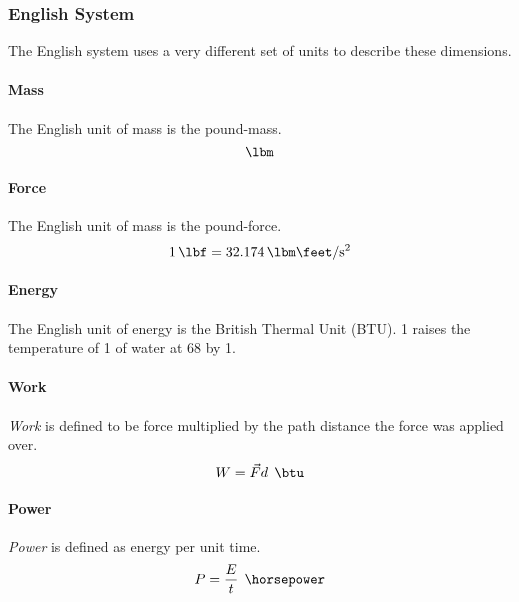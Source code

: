 \subsubsection{English System}\label{subsubsec:English_System}
The English system uses a very different set of units to describe these dimensions.

\paragraph{Mass}\label{par:English_Mass}
The English unit of mass is the pound-mass.
\begin{equation*}
  \si{\lbm}
\end{equation*}

\paragraph{Force}\label{par:English_Force}
The English unit of mass is the pound-force.
\begin{equation*}
  \SI{1}{\lbf} = \SI[per-mode=symbol]{32.174}{\lbm\feet\per\second\squared}
\end{equation*}

\paragraph{Energy}\label{par:English_Energy}
The English unit of energy is the British Thermal Unit (BTU).
\SI{1}{\btu} raises the temperature of \SI{1}{\lbm} of water at \SI{68}{\degreeF} by \SI{1}{\degreeF}.

\paragraph{Work}\label{par:English_Work}
\begin{definition}[Work]\label{def:Work}
  \emph{Work} is defined to be force multiplied by the path distance the force was applied over.
  \begin{equation}\label{eq:Work}
    W = \vec{F} d \:\: \si{\btu}
  \end{equation}
\end{definition}

\paragraph{Power}\label{par:English_Power}
\begin{definition}[Power]\label{def:Power}
  \emph{Power} is defined as energy per unit time.
  \begin{equation}\label{eq:Power}
    \Power = \frac{\Energy}{t} \:\: \si{\horsepower}
  \end{equation}
\end{definition}

